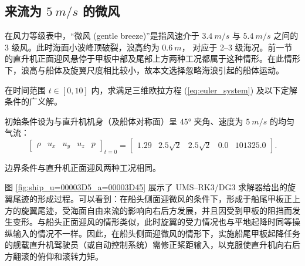 \subsection{来流为 $\SI{5}{m/s}$ 的微风}

在风力等级表中，“微风 (gentle breeze)”是指风速介于 $\SI{3.4}{m/s}$ 与 $\SI{5.4}{m/s}$
之间的 3 级风。此时海面小波峰顶破裂，浪高约为 $\SI{0.6}{m}$， 对应于 2–3 级海况。前一节的直升机正面迎风悬停于甲板中部及尾部上方两种工况都属于这种情形。在此情形下，浪高与船体及旋翼尺度相比较小，故本文选择忽略海浪引起的船体运动。
\begin{problem}
[直升机侧面迎微风悬停于甲板中部上方]\label{prob:=0076F4=005347=00673A=004FA7=009762=008FCE=005FAE=0098CE=0060AC=00505C=004E8E=007532=00677F=004E2D=0090E8=004E0A=0065B9}在时间范围
$t\in[0,10]$ 内，求满足三维欧拉方程 (\ref{eq:euler_system}) 及以下定解条件的广义解。

初始条件设为与直升机机身（及船体对称面）呈 $\ang{45}$ 夹角、速度为 $\SI{5}{m/s}$ 的均匀气流：
\begin{equation}
\begin{bmatrix}\rho & u_{x} & u_{y} & u_{z} & p\end{bmatrix}_{t=0}=\begin{bmatrix}1.29 & 2.5\sqrt{2} & 2.5\sqrt{2} & 0.0 & 101325.0\end{bmatrix}.
\end{equation}

边界条件与直升机正面迎风两种工况相同。
\end{problem}

图 \ref{fig:ship_u=00003D5_a=00003D45} 展示了 UMS–RK3/DG3 求解器给出的旋翼尾迹的形成过程。可以看到：在船头侧面迎微风的条件下，形成于船尾甲板正上方的旋翼尾迹，受海面自由来流的影响向右后方发展，并且因受到甲板的阻挡而发生变形。与船头正面迎风的情形类似，此时旋翼的受力情况也与平地起降时同等操纵输入的情况不一样。因此，在船头侧面迎微风的情形下，实施船尾甲板起降任务的舰载直升机驾驶员（或自动控制系统）需修正桨距输入，以克服使直升机向右后方翻滚的俯仰和滚转力矩。

